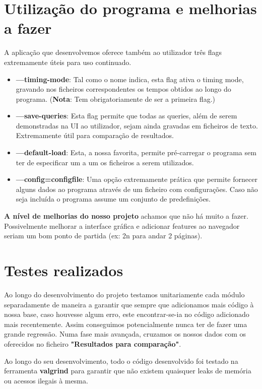 \documentclass[11pt]{article}
\begin{document}
\newpage
\section{Utilização do programa e melhorias a fazer}
A aplicação que desenvolvemos oferece também ao utilizador três flags extremamente úteis para uso continuado.
\begin{itemize}
    \item \textbf{---timing-mode}: Tal como o nome indica, esta flag ativa o timing mode, gravando nos ficheiros correspondentes os tempos obtidos ao longo do programa. (\textbf{Nota}: Tem obrigatoriamente de ser a primeira flag.)
    \item \textbf{---save-queries}: Esta flag permite que todas as queries, além de serem demonstradas na UI ao utilizador, sejam ainda gravadas em ficheiros de texto. Extremamente útil para comparação de resultados.
    \item \textbf{---default-load}: Esta, a nossa favorita, permite pré-carregar o programa sem ter de especificar um a um os ficheiros a serem utilizados.
    \item \textbf{---config=configfile}: Uma opção extremamente prática que permite fornecer alguns dados ao programa através de um ficheiro com configurações. Caso não seja incluída o programa assume um conjunto de predefinições.
\end{itemize}

\textbf{A nível de melhorias do nosso projeto} achamos que não há muito a fazer. Possivelmente melhorar a interface gráfica e adicionar features ao navegador seriam um bom ponto de partida (ex: 2n para andar 2 páginas).

\section{Testes realizados}
Ao longo do desenvolvimento do projeto testamos unitariamente cada módulo separadamente de maneira a garantir que sempre que adicionamos mais código à nossa base, caso houvesse algum erro, este encontrar-se-ia no código adicionado mais recentemente. Assim conseguimos potencialmente nunca ter de fazer uma grande regressão. Numa fase mais avançada, cruzamos os nossos dados com os oferecidos no ficheiro \textbf{"Resultados para comparação"}.

\vspace{1cm}
Ao longo do seu desenvolvimento, todo o código desenvolvido foi testado na ferramenta \textbf{valgrind} para garantir que não existem quaisquer leaks de memória ou acessos ilegais à mesma.
\end{document}
